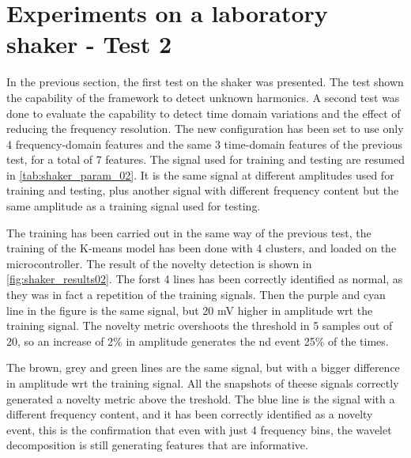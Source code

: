 \section{Experiments on a laboratory shaker - Test 2}
In the previous section, the first test on the shaker was presented. The test shown the capability of the framework to detect unknown harmonics. A second test was done to evaluate the capability to detect time domain variations and the effect of reducing the frequency resolution. The new configuration has been set to use only 4 frequency-domain features and the same 3 time-domain features of the previous test, for a total of 7 features. The signal used for training and testing are resumed in \autoref{tab:shaker_param_02}. It is the same signal at different amplitudes used for training and testing, plus another signal with different frequency content but the same amplitude as a training signal used for testing. 

The training has been carried out in the same way of the previous test, the training of the K-means model has been done with 4 clusters, and loaded on the microcontroller. The result of the novelty detection is shown in \autoref{fig:shaker_results02}. The forst 4 lines has been correctly identified as normal, as they was in fact a repetition of the training signals.
Then the purple and cyan line in the figure is the same signal, but 20 mV higher in amplitude \gls{wrt} the training signal. The novelty metric overshoots the threshold in 5 samples out of 20, so an increase of 2\% in amplitude generates the \gls{nd} event 25\% of the times. 

The brown, grey and green lines are the same signal, but with a bigger difference in amplitude \gls{wrt} the training signal. All the snapshots of theese signals correctly generated a novelty metric above the treshold. The blue line is the signal with a different frequency content, and it has been correctly identified as a novelty event, this is the confirmation that even with just 4 frequency bins, the wavelet decomposition is still generating features that are informative.

\todo %


